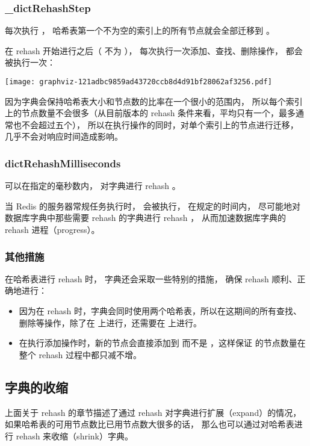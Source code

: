 \documentclass[a4paper,11pt,english]{sphinxmanual}
\begin{document}
\subsubsection{\_dictRehashStep}
\label{internal-datastruct/dict:dictrehashstep}
每次执行  ，
 哈希表第一个不为空的索引上的所有节点就会全部迁移到  。

在 rehash 开始进行之后（ 不为 ），
每次执行一次添加、查找、删除操作，
 都会被执行一次：

\texttt{[image: graphviz-121adbc9859ad43720ccb8d4d91bf28062af3256.pdf]}

因为字典会保持哈希表大小和节点数的比率在一个很小的范围内，
所以每个索引上的节点数量不会很多（从目前版本的 rehash 条件来看，平均只有一个，最多通常也不会超过五个），
所以在执行操作的同时，对单个索引上的节点进行迁移，
几乎不会对响应时间造成影响。


\subsubsection{dictRehashMilliseconds}
\label{internal-datastruct/dict:dictrehashmilliseconds}
 可以在指定的毫秒数内，
对字典进行 rehash 。

当 Redis 的服务器常规任务执行时，
 会被执行，
在规定的时间内，
尽可能地对数据库字典中那些需要 rehash 的字典进行 rehash ，
从而加速数据库字典的 rehash 进程（progress）。


\subsubsection{其他措施}
\label{internal-datastruct/dict:id19}
在哈希表进行 rehash 时，
字典还会采取一些特别的措施，
确保 rehash 顺利、正确地进行：
\begin{itemize}
\item {} 
因为在 rehash 时，字典会同时使用两个哈希表，所以在这期间的所有查找、删除等操作，除了在  上进行，还需要在  上进行。

\item {} 
在执行添加操作时，新的节点会直接添加到  而不是  ，这样保证  的节点数量在整个 rehash 过程中都只减不增。

\end{itemize}


\subsection{字典的收缩}
\label{internal-datastruct/dict:id20}
上面关于 rehash 的章节描述了通过 rehash 对字典进行扩展（expand）的情况，
如果哈希表的可用节点数比已用节点数大很多的话，
那么也可以通过对哈希表进行 rehash 来收缩（shrink）字典。
\end{document}
